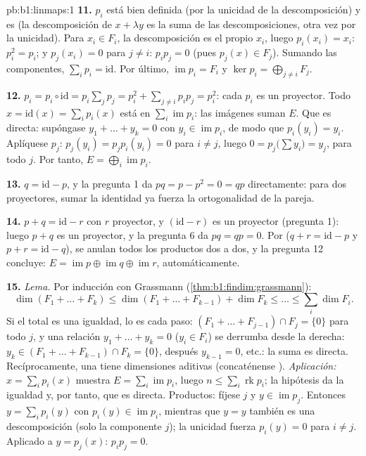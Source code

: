 \begin{solution}{pb:b1:linmaps:1}
\textbf{11.} $p_i$ está bien definida (por la unicidad de la
descomposición) y es  (la descomposición de $x + \lambda y$
es la suma de las descomposiciones, otra vez por la unicidad). Para
$x_i \in F_i$, la descomposición es el propio $x_i$, luego
$p_i(x_i) = x_i$: $p_i^2 = p_i$; y $p_j(x_i) = 0$ para $j \neq i$:
$p_i p_j = 0$ (pues $p_j(x) \in F_j$). Sumando las componentes,
$\sum_i p_i = \mathrm{id}$. Por último,
$\operatorname{im} p_i = F_i$ y $\ker p_i = \bigoplus_{j \neq i} F_j$.

\textbf{12.} $p_i = p_i \circ \mathrm{id} = p_i\sum_j p_j =
p_i^2 + \sum_{j \neq i} p_i p_j = p_i^2$: cada $p_i$ es un
proyector. Todo $x = \mathrm{id}(x) = \sum_i p_i(x)$ está en
$\sum_i \operatorname{im} p_i$: las imágenes suman $E$. Que es
directa: supóngase $y_1 + \dots + y_k = 0$ con
$y_i \in \operatorname{im} p_i$, de modo que $p_i(y_i) = y_i$.
Aplíquese $p_j$: $p_j (y_i) = p_j p_i (y_i) = 0$ para $i \neq j$,
luego $0 = p_j\bigl(\sum y_i\bigr) = y_j$, para todo $j$. Por tanto,
$E = \bigoplus_i \operatorname{im} p_i$.

\textbf{13.} $q = \mathrm{id} - p$, y la pregunta 1 da
$pq = p - p^2 = 0 = qp$ directamente: para dos proyectores, sumar la
identidad ya fuerza la ortogonalidad de la pareja.

\textbf{14.} $p + q = \mathrm{id} - r$ con $r$ proyector, y
$(\mathrm{id} - r)$ es un proyector (pregunta 1): luego $p + q$ es
un proyector, y la pregunta 6 da $pq = qp = 0$. Por 
($q + r = \mathrm{id} - p$ y $p + r = \mathrm{id} - q$), se anulan
todos los productos dos a dos, y la pregunta 12 concluye:
$E = \operatorname{im} p \oplus \operatorname{im} q \oplus
\operatorname{im} r$, automáticamente.

\textbf{15.} \emph{Lema.} Por inducción con Grassmann
(\cref{thm:b1:findim:grassmann}):
\[
\dim(F_1 + \dots + F_k) \leq \dim(F_1 + \dots + F_{k-1}) + \dim
F_k \leq \dots \leq \sum_i \dim F_i .
\]
Si el total es una igualdad, lo es cada paso:
$(F_1 + \dots + F_{j-1}) \cap F_j = \{0\}$ para todo $j$, y una
relación $y_1 + \dots + y_k = 0$ ($y_i \in F_i$) se derrumba desde la
derecha: $y_k \in (F_1 + \dots + F_{k-1}) \cap F_k = \{0\}$, después
$y_{k-1} = 0$, etc.: la suma es directa. Recíprocamente, una
 tiene dimensiones aditivas (concaténense ).
\emph{Aplicación:} $x = \sum_i p_i(x)$ muestra
$E = \sum_i \operatorname{im} p_i$, luego
$n \leq \sum_i \operatorname{rk} p_i$; la hipótesis da la igualdad y,
por tanto, que es directa. Productos: fíjese $j$ y
$y \in \operatorname{im} p_j$. Entonces $y = \sum_i p_i(y)$ con
$p_i(y) \in \operatorname{im} p_i$, mientras que $y = y$ también es
una descomposición (solo la componente $j$); la unicidad fuerza
$p_i(y) = 0$ para $i \neq j$. Aplicado a $y = p_j(x)$: $p_i p_j = 0$.


\end{solution}
